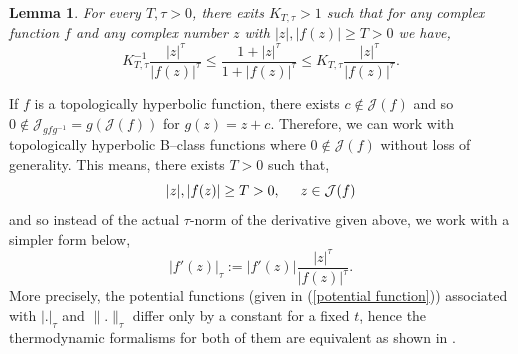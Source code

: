 \documentclass[12pt,reqno]{amsart}
\newtheorem{lemma}[theorem]{Lemma}
\begin{document}
\begin{lemma}\label{distortion for T}
   For every $T, \tau>0$, there exits $K_{T,\tau}>1$ such that for any complex function $f$ and any complex number $z$ with $|z|, |f(z)| \geq T>0$ we have,
    $$K_{T,\tau}^{-1} \dfrac{|z|^{\tau}}{|f(z)|^{\tau}} \leq \dfrac{1+|z|^{\tau}}{1+|f(z)|^{\tau}} \leq K_{T,\tau}\dfrac{|z|^{\tau}}{|f(z)|^{\tau}}.$$
\end{lemma}
\noindent If $f$ is a topologically hyperbolic function, there exists $c \not\in \mathcal{J}(f)$ and so $0 \not\in \mathcal{J}_{gfg^{-1}}=g(\mathcal{J}(f))$ for $g(z)=z+c$. Therefore, we can work with topologically hyperbolic B--class functions where $0 \not \in \mathcal{J}(f)$ without loss of generality. This means, there exists $T>0$ such that,
\begin{equation}\label{T}
    |z|, |f(z)| \geq T>0, \hspace{.5cm} z \in\mathcal{J}(f)
\end{equation}
and so instead of the actual $\tau$-norm of the derivative given above, we work with a simpler form below,
\begin{equation}\label{metric derivative}
    |f'(z)|_{\tau}:=|f'(z)|\dfrac{|z|^{\tau}}{|f(z)|^{\tau}}.
\end{equation}
More precisely, the potential functions (given in (\ref{potential function})) associated with $|.|_{\tau}$ and $\|.\|_{\tau}$ differ only by a constant for a fixed $t$, hence the thermodynamic formalisms for both of them are equivalent as shown in \citep[p. 444]{Munday}.
\end{document}
